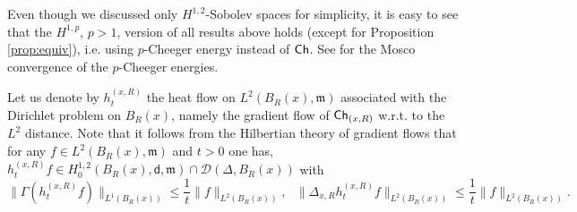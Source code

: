 \documentclass[a4paper,11pt,reqno]{article}
\numberwithin{equation}{section}
\theoremstyle{plain}
\theoremstyle{definition}
\theoremstyle{remark}
\newcommand{\Ch}{{\sf Ch}}
\newcommand{\dist}{\mathsf{d}}
\newcommand{\meas}{\mathfrak{m}}
\begin{document}
{\begin{remark}[$p$-energies]
Even though we discussed only $H^{1, 2}$-Sobolev spaces for simplicity, it is easy to see that the $H^{1, p}$, $p>1$, version of all 
results above holds (except for Proposition \ref{prop:equiv}), i.e. using $p$-Cheeger energy instead of $\Ch$. See \cite{AmbrosioHonda}
for the Mosco convergence of the $p$-Cheeger energies.
\end{remark}

Let us denote by $h_t^{(x, R)}$ the heat flow on $L^2(B_R(x), \meas)$ associated with the Dirichlet problem on $B_R(x)$, namely
the gradient flow of $\Ch_{(x,R)}$ w.r.t. to the $L^2$ distance. Note that it follows from the Hilbertian theory of gradient flows that 
for any $f \in L^2(B_R(x), \meas)$ and $t>0$ one has, $h_t^{(x, R)}f \in H^{1, 2}_0(B_R(x), \dist, \meas) \cap \mathcal{D}(\Delta, B_R(x))$ with 
\begin{equation}\label{eq:bound on lap}
\|\Gamma( h_t^{(x, R)}f)\|_{L^1(B_R(x))}\le \frac{1}{t}\|f\|_{L^2(B_R(x))},\,\,\,\,
\|\Delta_{x,R} h_t^{(x, R)}f\|_{L^2(B_R(x))} \le \frac{1}{t}\|f\|_{L^2(B_R(x))}.
\end{equation}

}
\end{document}
